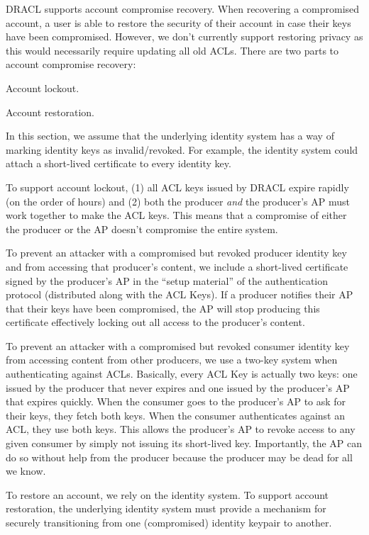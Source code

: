 \documentclass[pdftex,12pt,a4papaer,twoside,notitlepage]{report}
\begin{document}
DRACL supports account compromise recovery. When recovering a compromised
account, a user is able to restore the security of their account in case their
keys have been compromised. However, we don't currently support restoring
privacy as this would necessarily require updating all old ACLs. There are two
parts to account compromise recovery:

\begin{compactenum}
\item Account lockout.
\item Account restoration.
\end{compactenum}

In this section, we assume that the underlying identity system has a way of
marking identity keys as invalid/revoked. For example, the identity system could
attach a short-lived certificate to every identity key.

To support account lockout, (1) all ACL keys issued by DRACL expire rapidly (on
the order of hours) and (2) both the producer \emph{and} the producer's AP must
work together to make the ACL keys. This means that a compromise of either the
producer or the AP doesn't compromise the entire system.

To prevent an attacker with a compromised but revoked producer identity key and
from accessing that producer's content, we include a short-lived certificate
signed by the producer's AP in the ``setup material'' of the authentication
protocol (distributed along with the ACL Keys). If a producer notifies their AP
that their keys have been compromised, the AP will stop producing this
certificate effectively locking out all access to the producer's content.

To prevent an attacker with a compromised but revoked consumer identity key from
accessing content from other producers, we use a two-key system when
authenticating against ACLs. Basically, every ACL Key is actually two keys: one
issued by the producer that never expires and one issued by the producer's AP
that expires quickly. When the consumer goes to the producer's AP to ask for
their keys, they fetch both keys. When the consumer authenticates against an
ACL, they use both keys. This allows the producer's AP to revoke access to any
given consumer by simply not issuing its short-lived key. Importantly, the AP
can do so without help from the producer because the producer may be dead for
all we know.

To restore an account, we rely on the identity system. To support account
restoration, the underlying identity system must provide a mechanism for
securely transitioning from one (compromised) identity keypair to another.
\end{document}
